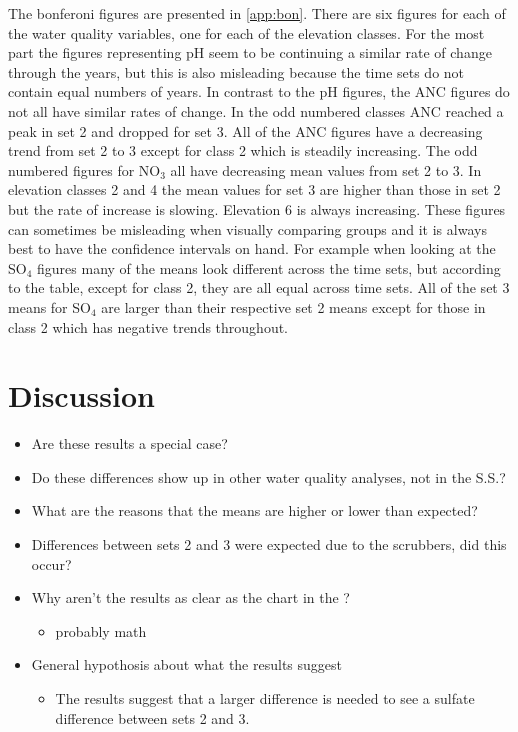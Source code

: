 The bonferoni figures are presented in \autoref{app:bon}.
There are six figures for each of the water quality variables, one for each of the elevation classes.
For the most part the figures representing pH seem to be continuing a similar rate of change through the years, but this is also misleading because the time sets do not contain equal numbers of years.
In contrast to the pH figures, the ANC figures do not all have similar rates of change.
In the odd numbered classes ANC reached a peak in set 2 and dropped for set 3.
All of the ANC figures have a decreasing trend from set 2 to 3 except for class 2 which is steadily increasing.
The odd numbered figures for NO$_3$ all have decreasing mean values from set 2 to 3.
In elevation classes 2 and 4 the mean values for set 3 are higher than those in set 2 but the rate of increase is slowing.
Elevation 6 is always increasing.
These figures can sometimes be misleading when visually comparing groups and it is always best to have the confidence intervals on hand.
For example when looking at the SO$_4$ figures many of the means look different across the time sets, but according to the table, except for class 2, they are all equal across time sets.
All of the set 3 means for SO$_4$ are larger than their respective set 2 means except for those in class 2 which has negative trends throughout.

\section{Discussion}
\begin{itemize}
	\item Are these results a special case?
	\item Do these differences show up in other water quality analyses, not in the S.S.?
	\item What are the reasons that the means are higher or lower than expected?
	\item Differences between sets 2 and 3 were expected due to the scrubbers, did this occur?
	\item Why aren't the results as clear as the chart in the \citep{cai2012}?
	\begin{itemize}
		\item probably math
	\end{itemize}
	\item General hypothosis about what the results suggest
	\begin{itemize}
		\item The results suggest that a larger difference is needed to see a sulfate difference between sets 2 and 3.
	\end{itemize}
\end{itemize}